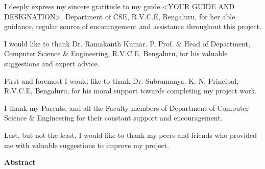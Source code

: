 \documentclass[12pt]{report}
\begin{document}
		I deeply express my sincere gratitude to my guide <YOUR GUIDE AND DESIGNATION>, 
		Department of CSE, R.V.C.E, Bengaluru, for her able guidance, regular source of encouragement and assistance 
		throughout this project. \bigskip
						
		I would like to thank Dr. Ramakanth Kumar. P, Prof. \& Head of Department, 
		Computer Science \& Engineering, R.V.C.E, Bengaluru, for his valuable suggestions and expert advice.\bigskip
						
		First and foremost I would like to thank 
		Dr. Subramanya. K. N, Principal, R.V.C.E, Bengaluru, for his moral support towards completing my project work.\bigskip
						
		I thank my Parents, and all the Faculty members of Department of 
		Computer Science \& Engineering for their constant support and encouragement.\bigskip
						
		Last, but not the least, I would like to thank my peers and friends who 
		provided me with valuable suggestions to improve my project.
						
		\pagebreak
						
		\begin{center}
			\Large\bfseries Abstract
		\end{center}
						
							
		\pagebreak
						
		\cleardoublepage
						
		\renewcommand\thepage{\romannumeral\numexpr\value{page}-1\relax}
						
		\tableofcontents
		\listoffigures
		\listoftables
						
						
		\cleardoublepage
\end{document}
